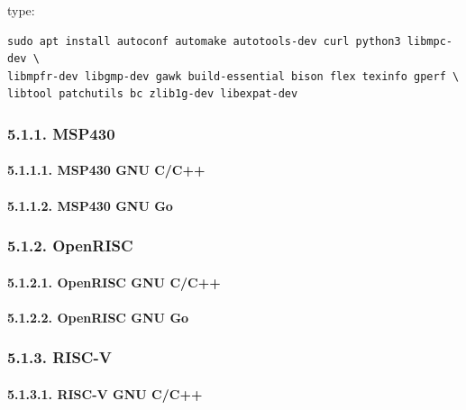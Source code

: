 \documentclass[
]{article}
\begin{document}
type:

\begin{verbatim}
sudo apt install autoconf automake autotools-dev curl python3 libmpc-dev \
libmpfr-dev libgmp-dev gawk build-essential bison flex texinfo gperf \
libtool patchutils bc zlib1g-dev libexpat-dev
\end{verbatim}

\hypertarget{msp430}{%
\subsubsection{5.1.1. MSP430}\label{msp430}}

\hypertarget{msp430-gnu-cc}{%
\paragraph{5.1.1.1. MSP430 GNU C/C++}\label{msp430-gnu-cc}}

\hypertarget{msp430-gnu-go}{%
\paragraph{5.1.1.2. MSP430 GNU Go}\label{msp430-gnu-go}}

\hypertarget{openrisc}{%
\subsubsection{5.1.2. OpenRISC}\label{openrisc}}

\hypertarget{openrisc-gnu-cc}{%
\paragraph{5.1.2.1. OpenRISC GNU C/C++}\label{openrisc-gnu-cc}}

\hypertarget{openrisc-gnu-go}{%
\paragraph{5.1.2.2. OpenRISC GNU Go}\label{openrisc-gnu-go}}

\hypertarget{risc-v}{%
\subsubsection{5.1.3. RISC-V}\label{risc-v}}

\hypertarget{risc-v-gnu-cc}{%
\paragraph{5.1.3.1. RISC-V GNU C/C++}\label{risc-v-gnu-cc}}
\end{document}
